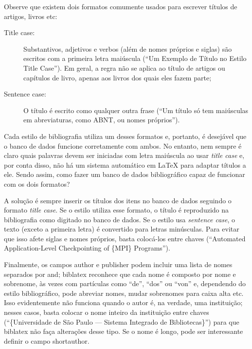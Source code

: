 Observe que existem dois formatos comumente usados para escrever títulos
de artigos, livros etc:

\begin{description}
  \item[Title case:] Substantivos, adjetivos e verbos (além de nomes
  próprios e siglas) são escritos com a primeira letra maiúscula (``Um
  Exemplo de Título no Estilo Title Case''). Em geral, a regra não se
  aplica ao título de artigos ou capítulos de livro, apenas aos livros
  dos quais eles fazem parte;

  \item[Sentence case:] O título é escrito como qualquer outra frase
  (``Um título só tem maiúsculas em abreviaturas, como ABNT, ou nomes
  próprios'').
\end{description}

Cada estilo de bibliografia utiliza um desses formatos e, portanto, é
desejável que o banco de dados funcione corretamente com ambos. No
entanto, nem sempre é claro quais palavras devem ser iniciadas com letra
maiúscula ao usar \textit{title case} e, por conta disso, não há um sistema
automático em \LaTeX{} para adaptar títulos a ele. Sendo assim, como fazer
um banco de dados bibliográfico capaz de funcionar com os dois formatos?

A solução é sempre inserir os títulos dos itens no banco de dados seguindo
o formato \textit{title case}. Se o estilo utiliza esse formato, o título
é reproduzido na bibliografia como digitado no banco de dados. Se o estilo
usa \textit{sentence case}, o texto (exceto a primeira letra) é convertido
para letras minúsculas. Para evitar que isso afete siglas e nomes próprios,
basta colocá-los entre chaves (``Automated Application-Level Checkpointing
of \{MPI\} Programs'').

Finalmente, os campos \textsf{author} e \textsf{publisher} podem incluir uma
lista de nomes separados por \textsf{and}; biblatex reconhece que cada nome é
composto por nome e sobrenome, às vezes com partículas como ``de'', ``dos''
ou ``von'' e, dependendo do estilo bibliográfico, pode abreviar nomes, mudar
sobrenomes para caixa alta etc. Isso evidentemente não funciona quando o autor
é, na verdade, uma instituição; nesses casos, basta colocar o nome inteiro da
instituição entre chaves (``\{Universidade de São Paulo --- Sistema Integrado
de Bibliotecas\}'') para que biblatex não faça alterações desse tipo. Se o
nome é longo, pode ser interessante definir o campo \textsf{shortauthor}.


